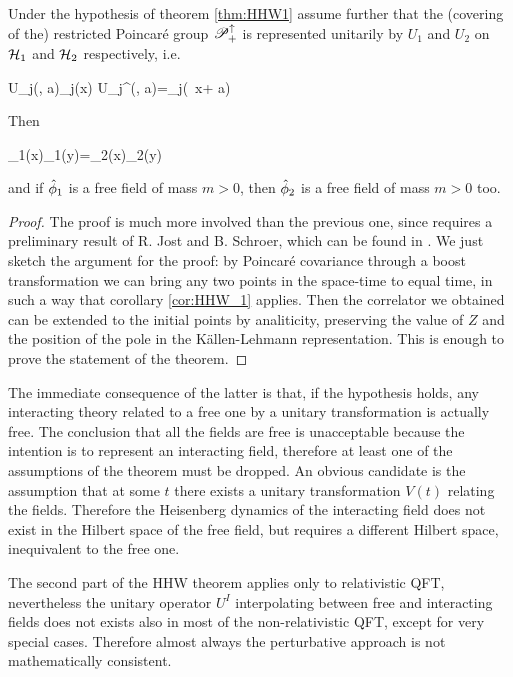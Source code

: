 \documentclass[../main/main.tex]{subfiles}
\begin{document}
\begin{theorem}\label{thm:HHW2}
	Under the hypothesis of theorem \ref{thm:HHW1} assume further that the (covering of the) restricted Poincaré group $\mathscr P_+^\uparrow$ is represented unitarily by $U_1$ and $U_2$ on $\mathcal H_1$ and $\mathcal H_2$ respectively, i.e.
	\begin{eq}
		U_j(\Lambda, a)\ophi_j(x) U_j^\dagger(\Lambda, a)=\ophi_j(\Lambda\, x+ a)
	\end{eq}
	Then
	\begin{eq}
		\ophi_1(x)\ophi_1(y)=\ophi_2(x)\ophi_2(y)\ket{0_2}
	\end{eq}
	and if $\hat{\phi}_1$ is a free field of mass $m>0$, then $\hat{\phi}_2$ is a free field of mass $m>0$ too.
\end{theorem}
\begin{proof}
	The proof is much more involved than the previous one, since requires a preliminary result of R. Jost and B. Schroer, which can be found in \cite[Thm. 4.15]{Streater:2000}. We just sketch the argument for the proof: by Poincaré covariance through a boost transformation we can bring any two points in the space-time to equal time, in such a way that corollary \ref{cor:HHW_1} applies. Then the correlator we obtained can be extended to the initial points by analiticity, preserving the value of $Z$ and the position of the pole in the Källen-Lehmann representation. This is enough to prove the statement of the theorem.  
\end{proof}

The immediate consequence of the latter is that, if the hypothesis holds, any interacting theory related to a free one by a unitary transformation is actually free. The conclusion that all the fields are free is unacceptable because the intention is to represent an interacting field, therefore at least one of the assumptions of the theorem must be dropped. An obvious candidate is the assumption that at some $t$ there exists a unitary transformation $V(t)$ relating the fields. Therefore the Heisenberg dynamics of the interacting field does not exist in the Hilbert space of the free field, but requires a different Hilbert space, inequivalent to the free one.  


The second part of the HHW theorem applies only to relativistic QFT, nevertheless the unitary operator $U^I$ interpolating between free and interacting fields does not exists also in most of the non-relativistic QFT, except for very special cases. Therefore almost always the perturbative approach is not mathematically consistent. 
\end{document}
